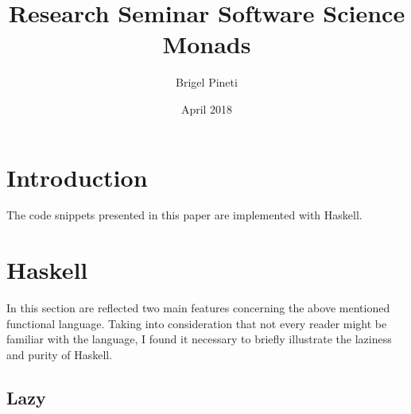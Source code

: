 \documentclass[a4paper, twocolumn]{article}
\title{\Large{Research Seminar Software Science} \\
\huge{Monads}}
\author{Brigel Pineti}
\date{April 2018}
\begin{document}
\maketitle

\section{Introduction}

The code snippets presented in this paper are implemented with Haskell. 

\section{Haskell}

In this section are reflected two main features concerning the above mentioned functional language. Taking into consideration that not every reader might be familiar with the language, I found it necessary to briefly illustrate the laziness and purity of Haskell.  

\subsection{Lazy}
\end{document}
